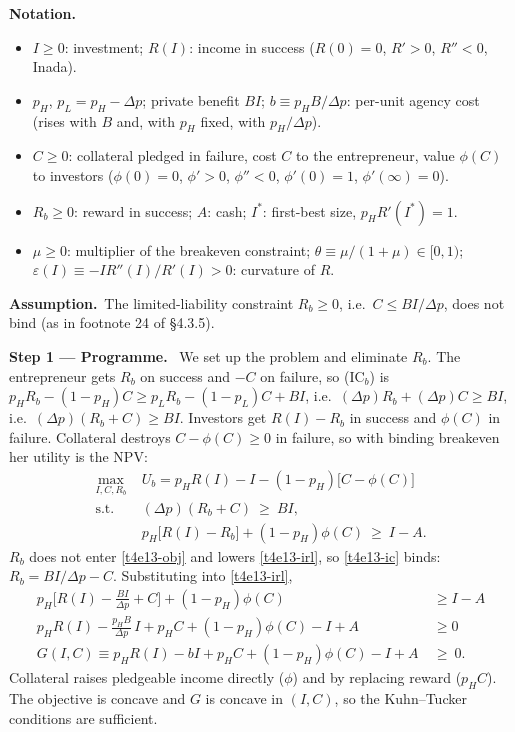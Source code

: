 \documentclass[11pt,a4paper]{article}
\newcommand{\notation}{\par\noindent\textbf{Notation.}}
\newcommand{\step}[2]{\par\medskip\noindent\textbf{Step #1 --- #2.}~}
\newcommand{\assume}{\par\smallskip\noindent\textbf{Assumption.}~}
\begin{document}
\notation
\begin{itemize}
  \item $I\ge0$: investment; $R(I)$: income in success ($R(0)=0$, $R'>0$, $R''<0$, Inada).
  \item $p_H$, $p_L=p_H-\Delta p$; private benefit $BI$; $b\equiv p_HB/\Delta p$: per-unit agency cost
        (rises with $B$ and, with $p_H$ fixed, with $p_H/\Delta p$).
  \item $C\ge0$: collateral pledged in failure, cost $C$ to the entrepreneur, value $\phi(C)$ to
        investors ($\phi(0)=0$, $\phi'>0$, $\phi''<0$, $\phi'(0)=1$, $\phi'(\infty)=0$).
  \item $R_b\ge0$: reward in success; $A$: cash; $I^*$: first-best size, $p_HR'(I^*)=1$.
  \item $\mu\ge0$: multiplier of the breakeven constraint; $\theta\equiv\mu/(1+\mu)\in[0,1)$;
        $\varepsilon(I)\equiv -IR''(I)/R'(I)>0$: curvature of $R$.
\end{itemize}
\assume The limited-liability constraint $R_b\ge0$, i.e.\ $C\le BI/\Delta p$, does not bind (as in
footnote 24 of \S4.3.5).

\step{1}{Programme} We set up the problem and eliminate $R_b$. The entrepreneur gets $R_b$ on
success and $-C$ on failure, so (IC$_b$) is
$p_HR_b-(1-p_H)C\ge p_LR_b-(1-p_L)C+BI$, i.e.\ $(\Delta p)R_b+(\Delta p)C\ge BI$, i.e.\
$(\Delta p)(R_b+C)\ge BI$. Investors get $R(I)-R_b$ in success and $\phi(C)$ in failure. Collateral
destroys $C-\phi(C)\ge0$ in failure, so with binding breakeven her utility is the NPV:
\begin{align}
  \max_{I,C,R_b}\; & U_b=p_HR(I)-I-(1-p_H)\big[C-\phi(C)\big] \label{t4e13-obj}\\
  \text{s.t. }\; & (\Delta p)(R_b+C)\ \ge\ BI, \tag{IC$_b$}\label{t4e13-ic}\\
  & p_H\big[R(I)-R_b\big]+(1-p_H)\phi(C)\ \ge\ I-A. \tag{IR$_l$}\label{t4e13-irl}
\end{align}
$R_b$ does not enter \eqref{t4e13-obj} and lowers \eqref{t4e13-irl}, so \eqref{t4e13-ic} binds:
$R_b=BI/\Delta p-C$. Substituting into \eqref{t4e13-irl},
\begin{align}
  p_H\Big[R(I)-\frac{BI}{\Delta p}+C\Big]+(1-p_H)\phi(C) &\ge I-A \nonumber\\
  p_HR(I)-\frac{p_HB}{\Delta p}\,I+p_HC+(1-p_H)\phi(C)-I+A &\ge 0 \nonumber\\
  G(I,C)\equiv p_HR(I)-bI+p_HC+(1-p_H)\phi(C)-I+A\ &\ge\ 0. \label{t4e13-G}
\end{align}
Collateral raises pledgeable income directly ($\phi$) and by replacing reward ($p_HC$).
The objective is concave and $G$ is concave in $(I,C)$, so the Kuhn--Tucker conditions are sufficient.
\end{document}
